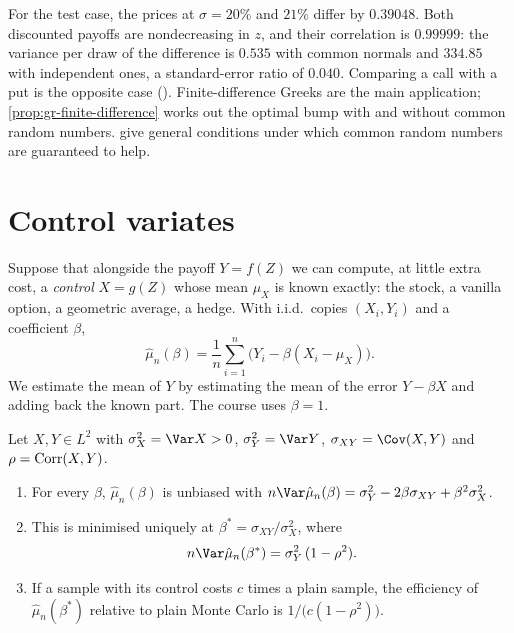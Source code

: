For the test case, the prices at $\sigma=20\%$ and $21\%$ differ by $0.39048$. Both
discounted payoffs are nondecreasing in $z$, and their correlation is $0.99999$: the
variance per draw of the difference is $0.535$ with common normals and $334.85$ with
independent ones, a standard-error ratio of $0.040$. Comparing a call with a put is the
opposite case (). Finite-difference Greeks are the main
application; \cref{prop:gr-finite-difference} works out the optimal bump with and without
common random numbers. \textcite{glasserman-yao-crn} give general conditions under which
common random numbers are guaranteed to help.

\section{Control variates}\label{sec:cv-control}

Suppose that alongside the payoff $Y=f(Z)$ we can compute, at little extra cost, a
\emph{control} $X=g(Z)$ whose mean $\mu_X$ is known exactly: the stock, a vanilla option,
a geometric average, a hedge. With i.i.d.\ copies $(X_i,Y_i)$ and a coefficient $\beta$,
\begin{equation}\label{eq:cv-estimator}
  \hat\mu_n(\beta)=\frac1n\sum_{i=1}^n\big(Y_i-\beta(X_i-\mu_X)\big).
\end{equation}
We estimate the mean of $Y$ by estimating the mean of the error $Y-\beta X$ and adding
back the known part. The course uses $\beta=1$.

\begin{theorem}\label{thm:cv-optimal}
Let $X,Y\in L^2$ with $\sigma_X^2=\Var X>0$, $\sigma_Y^2=\Var Y$, $\sigma_{XY}=\Cov(X,Y)$ and
$\rho=\operatorname{Corr}(X,Y)$.
\begin{enumerate}[label=(\roman*)]
  \item For every $\beta$, $\hat\mu_n(\beta)$ is unbiased with
    $n\Var\hat\mu_n(\beta)=\sigma_Y^2-2\beta\sigma_{XY}+\beta^2\sigma_X^2$.
  \item This is minimised uniquely at $\beta^*=\sigma_{XY}/\sigma_X^2$, where
    \[
      n\Var\hat\mu_n(\beta^*)=\sigma_Y^2\,(1-\rho^2).
    \]
  \item If a sample with its control costs $c$ times a plain sample, the efficiency of
    $\hat\mu_n(\beta^*)$ relative to plain Monte Carlo is $1/\big(c(1-\rho^2)\big)$.
\end{enumerate}
\end{theorem}

